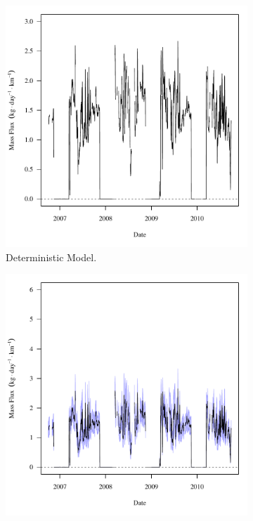 \begin{linenumbers}
\begin{landscape}
\begin{figure}
\begin{subfigure}{0.7\textwidth}
			\includegraphics[width=\tableCustomSize]{"Figures/Results_USR/Deterministic/f CON"}
			\caption{Deterministic Model.}
		\end{subfigure}%
		\begin{subfigure}{0.7\textwidth}
			\centering
			\includegraphics[width=\tableCustomSize]{"Figures/Results_USR/Stochastic/f CON"}

\end{subfigure}
\end{figure}
\end{landscape}
\end{linenumbers}
